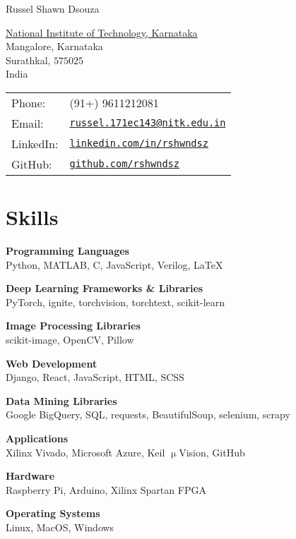 \documentclass[letterpaper]{article}
\def\name{Russel Shawn Dsouza}
\renewenvironment{itemize}{
  \begin{list}{}{
    \setlength{\leftmargin}{1.5em}
  }
}{
  \end{list}
}
\begin{document}
{\huge \name}


\vspace{0.25in}

\begin{minipage}{0.45\linewidth}
  \href{http://www.nitk.ac.in/}{National Institute of Technology, Karnataka} \\
  Mangalore, Karnataka \\
  Surathkal, $575025$\\
  India
\end{minipage}
\hfill
\begin{minipage}{0.45\linewidth}
  \begin{tabular}{ll}
    Phone: & (91+) 9611212081 \\
    Email: & \href{mailto:russel.171ec143@nitk.edu.in}{\tt russel.171ec143@nitk.edu.in} \\
    LinkedIn: & \href{https://www.linkedin.com/in/rshwndsz}{\tt linkedin.com/in/rshwndsz} \\
    GitHub: & \href{https://www.github.com/rshwndsz}{\tt github.com/rshwndsz}
  \end{tabular}
\end{minipage}

\section*{Skills}
  \begin{itemize}
    \item \textbf{Programming Languages}\\ 
    Python, MATLAB, C, JavaScript, Verilog, \LaTeX
    \item \textbf{Deep Learning Frameworks \& Libraries}\\ 
    PyTorch, ignite, torchvision, torchtext, scikit-learn
    \item \textbf{Image Processing Libraries}\\
    scikit-image, OpenCV, Pillow
    \item \textbf{Web Development}\\
    Django, React, JavaScript, HTML, SCSS
    \item \textbf{Data Mining Libraries}\\
    Google BigQuery, SQL, requests, BeautifulSoup, selenium, scrapy
    \item \textbf{Applications}\\
    Xilinx Vivado, Microsoft Azure, Keil $\upmu$Vision, GitHub
    \item \textbf{Hardware}\\
    Raspberry Pi, Arduino, Xilinx Spartan FPGA
    \item \textbf{Operating Systems}\\
    Linux, MacOS, Windows
  \end{itemize}
\end{document}
